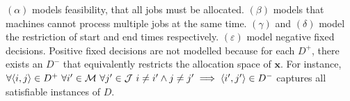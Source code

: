 $(\alpha)$ models feasibility, that all jobs must be allocated. $(\beta)$ models that machines cannot process multiple jobs at the same time. $(\gamma)$ and $(\delta)$ model the restriction of start and end times respectively. $(\varepsilon)$ model negative fixed decisions. Positive fixed decisions are not modelled because for each $D^+$, there exists an $D^-$ that equivalently restricts the allocation space of $\mathbf{x}$. For instance, $\forall\pair{i}{j}\in D^+\ \forall i'\in\mathcal{M}\ \forall j'\in\mathcal{J}\ i\neq i'\land j\neq j'\implies\pair{i'}{j'}\in D^-$ captures all satisfiable instances of $D$.
